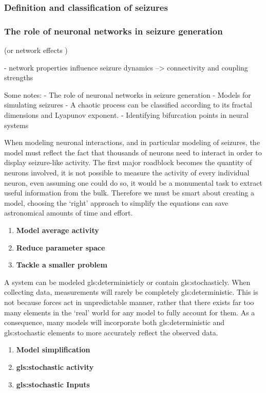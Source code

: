 \documentclass[../../Orator.tex]{subfiles}
\begin{document}
\subsubsection*{Definition and classification of seizures}



\subsubsection{The role of neuronal networks in seizure generation}
(or network effects )

- network properties influence seizure dynamics --> connectivity and coupling strengths


Some notes:
- The role of neuronal networks in seizure generation
- Models for simulating seizures
- A chaotic process can be classified according to its fractal dimensions and Lyapunov exponent.
- Identifying bifurcation points in neural systems 



When modeling neuronal interactions, and in particular modeling of seizures, the model must reflect the fact that thousands of neurons need to interact in order to display seizure-like activity. 
The first major roadblock becomes the quantity of neurons involved, it is not possible to measure the activity of every individual neuron, even assuming one could do so, it would be a monumental task to extract useful information from the bulk. 
Therefore we must be smart about creating a model, choosing the `right' approach to simplify the equations can save astronomical amounts of time and effort.
\begin{enumerate}
    \item \textbf{Model average activity}
    \item \textbf{Reduce parameter space}
    \item \textbf{Tackle a smaller problem}
\end{enumerate}


A system can be modeled \gls{gls:deterministic}ly or contain \gls{gls:stochastic}ly. When collecting data, measurements will rarely be completely \gls{gls:deterministic}. This is not because forces act in unpredictable manner, rather that there exists far too many elements in the `real' world for any model to fully account for them. 
As a consequence, many models will incorporate both \gls{gls:deterministic} and \gls{gls:stochastic} elements to more accurately reflect the observed data.
\begin{enumerate}
    \item \textbf{Model simplification}
    \item \textbf{\Gls{gls:stochastic} activity}
    \item \textbf{\gls{gls:stochastic} Inputs}
\end{enumerate}
\end{document}
